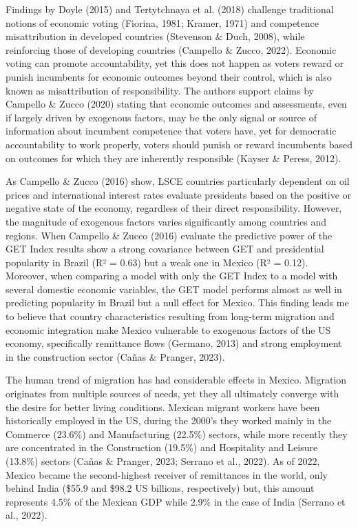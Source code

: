 \documentclass[
]{article}
\begin{document}
Findings by Doyle (2015) and Tertytchnaya et al. (2018) challenge
traditional notions of economic voting (Fiorina, 1981; Kramer, 1971) and
competence misattribution in developed countries (Stevenson \& Duch,
2008), while reinforcing those of developing countries (Campello \&
Zucco, 2022). Economic voting can promote accountability, yet this does
not happen as voters reward or punish incumbents for economic outcomes
beyond their control, which is also known as misattribution of
responsibility. The authors support claims by Campello \& Zucco (2020)
stating that economic outcomes and assessments, even if largely driven
by exogenous factors, may be the only signal or source of information
about incumbent competence that voters have, yet for democratic
accountability to work properly, voters should punish or reward
incumbents based on outcomes for which they are inherently responsible
(Kayser \& Peress, 2012).

As Campello \& Zucco (2016) show, LSCE countries particularly dependent
on oil prices and international interest rates evaluate presidents based
on the positive or negative state of the economy, regardless of their
direct responsibility. However, the magnitude of exogenous factors
varies significantly among countries and regions. When Campello \& Zucco
(2016) evaluate the predictive power of the GET Index results show a
strong covariance between GET and presidential popularity in Brazil (R²
= 0.63) but a weak one in Mexico (R² = 0.12). Moreover, when comparing a
model with only the GET Index to a model with several domestic economic
variables, the GET model performs almost as well in predicting
popularity in Brazil but a null effect for Mexico. This finding leads me
to believe that country characteristics resulting from long-term
migration and economic integration make Mexico vulnerable to exogenous
factors of the US economy, specifically remittance flows (Germano, 2013)
and strong employment in the construction sector (Cañas \& Pranger,
2023).

The human trend of migration has had considerable effects in Mexico.
Migration originates from multiple sources of needs, yet they all
ultimately converge with the desire for better living conditions.
Mexican migrant workers have been historically employed in the US,
during the 2000's they worked mainly in the Commerce (23.6\%) and
Manufacturing (22.5\%) sectors, while more recently they are
concentrated in the Construction (19.5\%) and Hospitality and Leisure
(13.8\%) sectors (Cañas \& Pranger, 2023; Serrano et al., 2022). As of
2022, Mexico became the second-highest receiver of remittances in the
world, only behind India (\$55.9 and \$98.2 US billions, respectively)
but, this amount represents 4.5\% of the Mexican GDP while 2.9\% in the
case of India (Serrano et al., 2022).
\end{document}
